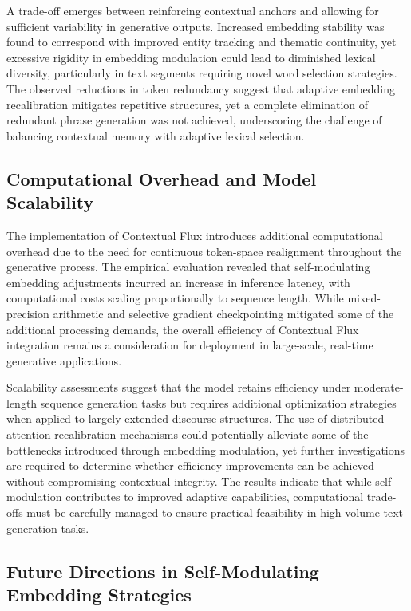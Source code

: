 \documentclass{article}
\begin{document}
A trade-off emerges between reinforcing contextual anchors and allowing for sufficient variability in generative outputs. Increased embedding stability was found to correspond with improved entity tracking and thematic continuity, yet excessive rigidity in embedding modulation could lead to diminished lexical diversity, particularly in text segments requiring novel word selection strategies. The observed reductions in token redundancy suggest that adaptive embedding recalibration mitigates repetitive structures, yet a complete elimination of redundant phrase generation was not achieved, underscoring the challenge of balancing contextual memory with adaptive lexical selection.

\subsection{Computational Overhead and Model Scalability}

The implementation of Contextual Flux introduces additional computational overhead due to the need for continuous token-space realignment throughout the generative process. The empirical evaluation revealed that self-modulating embedding adjustments incurred an increase in inference latency, with computational costs scaling proportionally to sequence length. While mixed-precision arithmetic and selective gradient checkpointing mitigated some of the additional processing demands, the overall efficiency of Contextual Flux integration remains a consideration for deployment in large-scale, real-time generative applications.

Scalability assessments suggest that the model retains efficiency under moderate-length sequence generation tasks but requires additional optimization strategies when applied to largely extended discourse structures. The use of distributed attention recalibration mechanisms could potentially alleviate some of the bottlenecks introduced through embedding modulation, yet further investigations are required to determine whether efficiency improvements can be achieved without compromising contextual integrity. The results indicate that while self-modulation contributes to improved adaptive capabilities, computational trade-offs must be carefully managed to ensure practical feasibility in high-volume text generation tasks.

\subsection{Future Directions in Self-Modulating Embedding Strategies}
\end{document}
